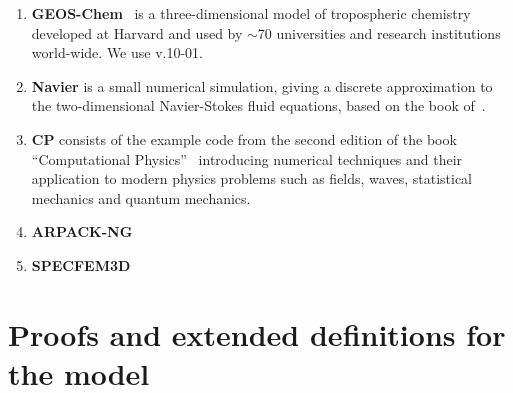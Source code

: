 \begin{enumerate}
\item \textbf{GEOS-Chem}~\cite{geos-chem} is a three-dimensional model
  of tropospheric chemistry developed at Harvard and used by $\sim$70
  universities and research institutions world-wide. We use v.10-01.

\item \textbf{Navier} is a small numerical simulation, giving a
  discrete approximation to the two-dimensional Navier-Stokes fluid
  equations, based on the book of~\citet{griebel1997numerical}.

\item \textbf{CP} consists of the example code from the second edition
  of the book ``Computational
  Physics''~\cite{nicholas2006computational} introducing numerical
  techniques and their application to modern physics problems such as
  fields, waves, statistical mechanics and quantum mechanics.

\item \textbf{ARPACK-NG}~\cite{arpackng} 

\item \textbf{SPECFEM3D}~\cite{specfem3d} 
\end{enumerate}

\section{Proofs and extended definitions for the model}
\label{sec:proofs}


